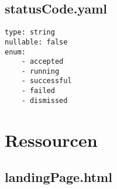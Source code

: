 \subsection{statusCode.yaml}
\begin{lstlisting}[caption={statusCode.yaml}, style = JSON]
type: string
nullable: false
enum:
    - accepted
    - running
    - successful
    - failed
    - dismissed
\end{lstlisting}\label{SchemaStatusCodeyaml}

\section{Ressourcen}
\renewcommand{\lstlistingname}{Ressource}
\subsection{landingPage.html}
